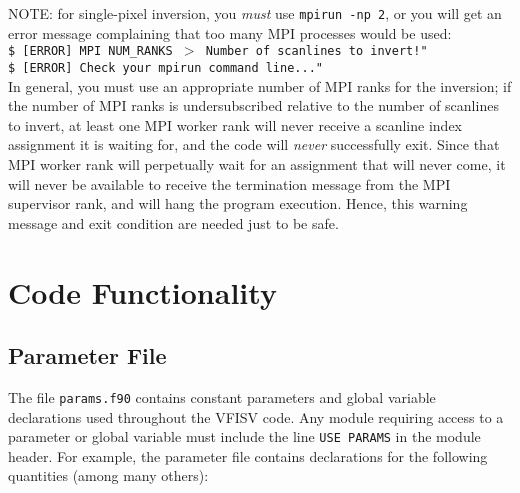 \documentclass[11pt]{article}
\begin{document}
NOTE: for single-pixel inversion, you \textit{must} use \texttt{mpirun -np 2}, or
you will get an error message complaining that too many MPI processes would be used:\\

\texttt{\indent \$ [ERROR] MPI NUM\_RANKS $>$ Number of scanlines to invert!"\\
        \indent \$ [ERROR] Check your mpirun command line..."}\\

In general, you must use an appropriate number of MPI ranks for the inversion; if the number of
MPI ranks is undersubscribed relative to the number of scanlines to invert, at least one MPI worker
rank will never receive a scanline index assignment it is waiting for, and the code will
\textit{never} successfully exit.  Since that MPI worker rank will perpetually wait for an
assignment that will never come, it will never be available to receive the termination message
from the MPI supervisor rank, and will hang the program execution.  Hence, this warning message and
exit condition are needed just to be safe.



\clearpage
\section{Code Functionality}

\subsection{Parameter File}\label{s:params}
The file \texttt{params.f90} contains constant parameters and global variable declarations
used throughout the VFISV code.  Any module requiring access to a parameter or global variable
must include the line \texttt{USE PARAMS} in the module header.  For example, the parameter
file contains declarations for the following quantities (among many others):\\
\end{document}
